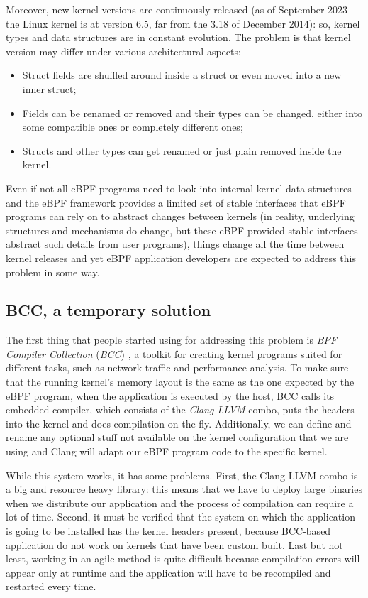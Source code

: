 Moreover, new kernel versions are continuously released (as of September 2023 the Linux kernel is at version 6.5, far from the 3.18 of December 2014): so, kernel types and data structures are in constant evolution.
The problem is that kernel version may differ under various architectural aspects:

\begin{itemize}
	\item 
		Struct fields are shuffled around inside a struct or even moved into a new inner struct;
	\item 
		Fields can be renamed or removed and their types can be changed, either into some compatible ones or completely different ones;
	\item 
		Structs and other types can get renamed or just plain removed inside the kernel.
\end{itemize} 

Even if not all eBPF programs need to look into internal kernel data structures and the eBPF framework provides a limited set of stable interfaces that eBPF programs can rely on to abstract changes between kernels (in reality, underlying structures and mechanisms do change, but these eBPF-provided stable interfaces abstract such details from user programs), things change all the time between kernel releases and yet eBPF application developers are expected to address this problem in some way. 

\subsection{BCC, a temporary solution}

The first thing that people started using for addressing this problem is \textit{BPF Compiler Collection} (\textit{BCC}) \cite{BCCRepo}, a toolkit for creating kernel programs suited for different tasks, such as network traffic and performance analysis.
To make sure that the running kernel's memory layout is the same as the one expected by the eBPF program, when the application is executed by the host, BCC calls its embedded compiler, which consists of the \textit{Clang-LLVM} combo, puts the headers into the kernel and does compilation on the fly.
Additionally, we can define and rename any optional stuff not available on the kernel configuration that we are using and Clang will adapt our eBPF program code to the specific kernel.

While this system works, it has some problems.
First, the Clang-LLVM combo is a big and resource heavy library: this means that we have to deploy large binaries when we distribute our application and the process of compilation can require a lot of time.
Second, it must be verified that the system on which the application is going to be installed has the kernel headers present, because BCC-based application do not work on kernels that have been custom built.
Last but not least, working in an agile method is quite difficult because compilation errors will appear only at runtime and the application will have to be recompiled and restarted every time.

